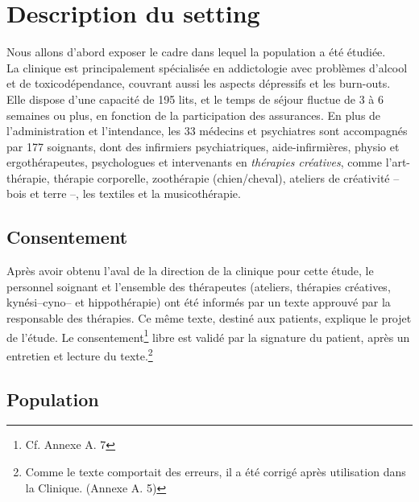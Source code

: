  
 \section{Description du setting}
 Nous allons
 d'abord exposer le cadre dans lequel la
 population a été étudiée.
 \\
 La clinique  est  principalement spécialisée en
 addictologie avec problèmes d'alcool et de toxicodépendance, couvrant aussi les aspects dépressifs
 et les
 burn-outs.
 Elle dispose d'une capacité de 195 lits, et le temps de séjour fluctue de 3 à 6 semaines ou plus, en
 fonction de la participation des assurances.
En plus de l'administration et l'intendance, les 33
 médecins et psychiatres sont
 accompagnés par 177
 soignants, dont des infirmiers psychiatriques, aide-infirmières, physio et
 ergothérapeutes,
 psychologues et intervenants en \textit{thérapies
 créatives}, comme l'art-thérapie, thérapie
 corporelle, zoothérapie (chien/cheval),  ateliers de créativité -- bois et terre --, les textiles et la 
 musicothérapie.

 \subsection{Consentement}
 Après avoir obtenu l'aval de la direction de la
 clinique pour cette étude,  le personnel soignant et l'ensemble des
 thérapeutes (ateliers, thérapies créatives, kynési--cyno--
 et hippothérapie) ont été  informés par un texte approuvé par la responsable des thérapies.
 Ce même texte, destiné aux
 patients, explique le projet de l'étude. %
 Le consentement\footnote{Cf. Annexe A. 7} libre est validé par la signature du patient, après
 un entretien et lecture du texte.\footnote{Comme le texte comportait des erreurs, il a été 
 corrigé après utilisation dans la Clinique. (Annexe A. 5)}
 
 
 \subsection{Population}
 
